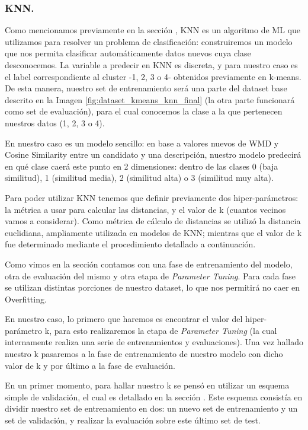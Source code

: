 \documentclass[12pt,a4paper]{article}
\begin{document}
\begin{sloppypar}
\subsubsection{KNN.}\label{imp_knn}

Como mencionamos previamente en la sección \textit{}, KNN es un algoritmo de ML que utilizamos para resolver un problema de clasificación: construiremos un modelo que nos permita clasificar automáticamente datos nuevos cuya clase desconocemos. La variable a predecir en KNN es discreta, y para nuestro caso es el label correspondiente al cluster -1, 2, 3 o 4- obtenidos previamente en k-means. De esta manera, nuestro set de entrenamiento será una parte del dataset base descrito en la Imagen \ref{fig:dataset_kmeans_knn_final} (la otra parte funcionará como set de evaluación), para el cual conocemos la clase a la que pertenecen nuestros datos (1, 2, 3 o 4).

En nuestro caso es un modelo sencillo: en base a valores nuevos de WMD y Cosine Similarity entre un candidato y una descripción, nuestro modelo predecirá en qué clase caerá este punto en 2 dimensiones: dentro de las clases 0 (baja similitud), 1 (similitud media), 2 (similitud alta) o 3 (similitud muy alta). 

Para poder utilizar KNN tenemos que definir previamente dos hiper-parámetros: la métrica a usar para calcular las distancias, y el valor de k (cuantos vecinos vamos a considerar). Como métrica de cálculo de distancias se utilizó la distancia euclidiana, ampliamente utilizada en modelos de KNN; mientras que el valor de k fue determinado mediante el procedimiento detallado a continuación. 

Como vimos en la sección \textit{} contamos con una fase de entrenamiento del modelo, otra de evaluación del mismo y otra etapa de \textit{Parameter Tuning}. Para cada fase se utilizan distintas porciones de nuestro dataset, lo que nos permitirá no caer en Overfitting. 

En nuestro caso, lo primero que haremos es encontrar el valor del hiper-parámetro k, para esto realizaremos la etapa de \textit{Parameter Tuning} (la cual internamente realiza una serie de entrenamientos y evaluaciones). Una vez hallado nuestro k pasaremos a la fase de entrenamiento de nuestro modelo con dicho valor de k y por último a la fase de evaluación. 

En un primer momento, para hallar nuestro k se pensó en utilizar un esquema simple de validación, el cual es detallado en la sección \textit{}. Este esquema consistía en dividir nuestro set de entrenamiento en dos: un nuevo set de entrenamiento y un set de validación, y realizar la evaluación sobre este último set de test.


\end{sloppypar}
\end{document}

